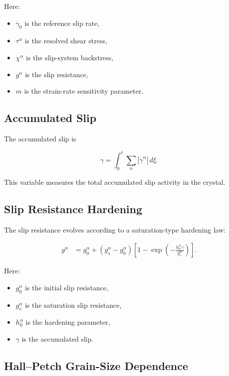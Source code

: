 ﻿\documentclass[11pt,a4paper]{article}
\begin{document}
Here:

\begin{itemize}[leftmargin=*]
    \item $\dot{\gamma}_0$ is the reference slip rate,
    \item $\tau^{\alpha}$ is the resolved shear stress,
    \item $\chi^{\alpha}$ is the slip-system backstress,
    \item $g^{\alpha}$ is the slip resistance,
    \item $m$ is the strain-rate sensitivity parameter.
\end{itemize}

\subsection{Accumulated Slip}

The accumulated slip is

\[
\gamma
=
\int_0^t
\sum_{\alpha}
\left|
\dot{\gamma}^{\alpha}
\right|
\,d\xi.
\]

This variable measures the total accumulated slip activity in the crystal.

\subsection{Slip Resistance Hardening}

The slip resistance evolves according to a saturation-type hardening law:

\[
\begin{aligned}
g^{\alpha}
&=
g_0^{\alpha}
+
\left(
g_s^{\alpha}
-
g_0^{\alpha}
\right)
\left[
1
-
\exp
\left(
-
\frac{
h_0^{\alpha}\gamma
}{
g_s^{\alpha}
}
\right)
\right].
\end{aligned}
\]

Here:

\begin{itemize}[leftmargin=*]
    \item $g_0^{\alpha}$ is the initial slip resistance,
    \item $g_s^{\alpha}$ is the saturation slip resistance,
    \item $h_0^{\alpha}$ is the hardening parameter,
    \item $\gamma$ is the accumulated slip.
\end{itemize}

\subsection{Hall--Petch Grain-Size Dependence}
\end{document}
